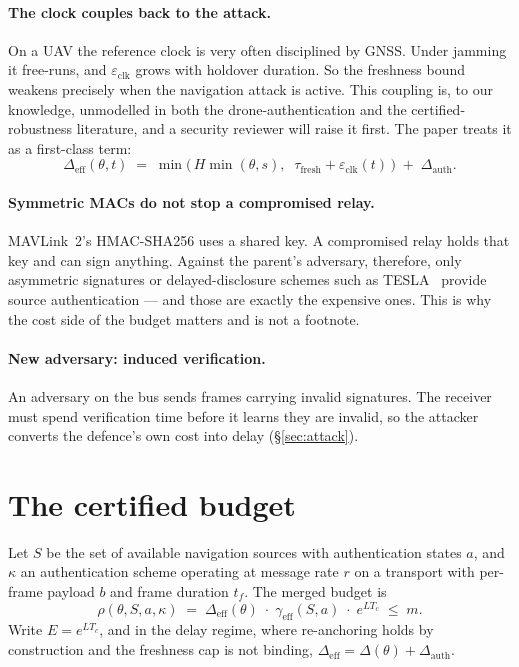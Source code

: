 \documentclass[11pt,a4paper]{article}
\newcommand{\Dauth}{\Delta_{\mathrm{auth}}}
\newcommand{\geff}{\gamma_{\mathrm{eff}}}
\newcommand{\tfresh}{\tau_{\mathrm{fresh}}}
\newcommand{\eclk}{\varepsilon_{\mathrm{clk}}}
\begin{document}
\paragraph{The clock couples back to the attack.} On a UAV the reference clock
is very often disciplined by GNSS. Under jamming it free-runs, and $\eclk$ grows
with holdover duration. So the freshness bound weakens precisely when the
navigation attack is active. This coupling is, to our knowledge, unmodelled in
both the drone-authentication and the certified-robustness literature, and a
security reviewer will raise it first. The paper treats it as a first-class
term:
\begin{equation}
\label{eq:delta-eff}
\Delta_{\mathrm{eff}}(\theta,t) \;=\;
\min\!\big(\,H\min(\theta,s),\;\; \tfresh+\eclk(t)\,\big) \;+\; \Dauth .
\end{equation}

\paragraph{Symmetric MACs do not stop a compromised relay.} MAVLink~2's
HMAC-SHA256 uses a shared key. A compromised relay holds that key and can sign
anything. Against the parent's adversary, therefore, only asymmetric signatures
or delayed-disclosure schemes such as TESLA~\cite{perrig2000tesla} provide
source authentication --- and those are exactly the expensive ones. This is why
the cost side of the budget matters and is not a footnote.

\paragraph{New adversary: induced verification.} An adversary on the bus sends
frames carrying invalid signatures. The receiver must spend verification time
before it learns they are invalid, so the attacker converts the defence's own
cost into delay (\S\ref{sec:attack}).

\section{The certified budget}
\label{sec:theory}
Let $S$ be the set of available navigation sources with authentication states
$a$, and $\kappa$ an authentication scheme operating at message rate $r$ on a
transport with per-frame payload $b$ and frame duration $t_f$. The merged
budget is
\begin{equation}
\label{eq:budget}
\rho(\theta,S,a,\kappa) \;=\;
\Delta_{\mathrm{eff}}(\theta)\;\cdot\;\geff(S,a)\;\cdot\;e^{LT_c}\;\le\;m .
\end{equation}
Write $E=e^{LT_c}$, and in the delay regime, where re-anchoring holds by
construction and the freshness cap is not binding, $\Delta_{\mathrm{eff}} =
\Delta(\theta)+\Dauth$.
\end{document}
